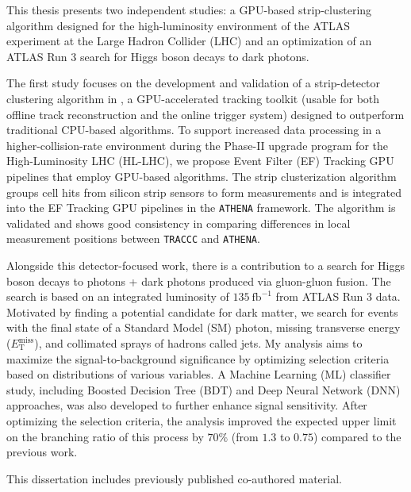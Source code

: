 This thesis presents two independent studies: a GPU-based strip-clustering algorithm designed for the high-luminosity environment of the ATLAS experiment at the Large Hadron Collider (LHC) and an optimization of an ATLAS Run 3 search for Higgs boson decays to dark photons.

The first study focuses on the development and validation of a strip-detector clustering algorithm in , a GPU-accelerated tracking toolkit (usable for both offline track reconstruction and the online trigger system) designed to outperform traditional CPU-based algorithms. To support increased data processing in a higher-collision-rate environment during the Phase-II upgrade program for the High-Luminosity LHC (HL-LHC), we propose Event Filter (EF) Tracking GPU pipelines that employ GPU-based algorithms. The strip clusterization algorithm groups cell hits from silicon strip sensors to form measurements and is integrated into the EF Tracking GPU pipelines in the \texttt{ATHENA} framework. The algorithm is validated and shows good consistency in comparing differences in local measurement positions between \texttt{TRACCC} and \texttt{ATHENA}. 

Alongside this detector-focused work, there is a contribution to a search for Higgs boson decays to photons + dark photons produced via gluon-gluon fusion. The search is based on an integrated luminosity of $135~\mathrm{fb}^{-1}$ from ATLAS Run 3 data. Motivated by finding a potential candidate for dark matter, we search for events with the final state of a Standard Model (SM) photon, missing transverse energy ($E_{\mathrm{T}}^{\mathrm{miss}}$), 
and collimated sprays of hadrons called jets. My analysis aims to maximize the signal-to-background significance by optimizing selection criteria based on distributions of various variables. A Machine Learning (ML) classifier study, including Boosted Decision Tree (BDT) and Deep Neural Network (DNN) approaches, was also developed to further enhance signal sensitivity. After optimizing the selection criteria, the analysis improved the expected upper limit on the branching ratio of this process by $70\%$ (from $1.3$ to $0.75$) compared to the previous work. 

This dissertation includes previously published co-authored material.



